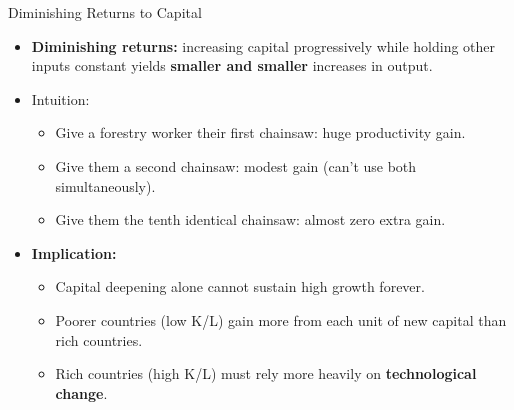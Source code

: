 \documentclass[aspectratio=169]{beamer}
\begin{document}
\begin{frame}{Diminishing Returns to Capital}
\transfade
\begin{itemize}
  \item \textbf{Diminishing returns:} increasing capital progressively while holding other inputs constant yields \textbf{smaller and smaller} increases in output.
  \item Intuition:
  \begin{itemize}
    \item Give a forestry worker their first chainsaw: \alert{huge} productivity gain.
    \item Give them a second chainsaw: modest gain (can't use both simultaneously).
    \item Give them the tenth identical chainsaw: almost zero extra gain.
  \end{itemize}
  \item \textbf{Implication:}
  \begin{itemize}
    \item Capital deepening alone cannot sustain high growth forever.
    \item Poorer countries (low K/L) gain more from each unit of new capital than rich countries.
    \item Rich countries (high K/L) must rely more heavily on \textbf{technological change}.
  \end{itemize}
\end{itemize}
\end{frame}
\end{document}
